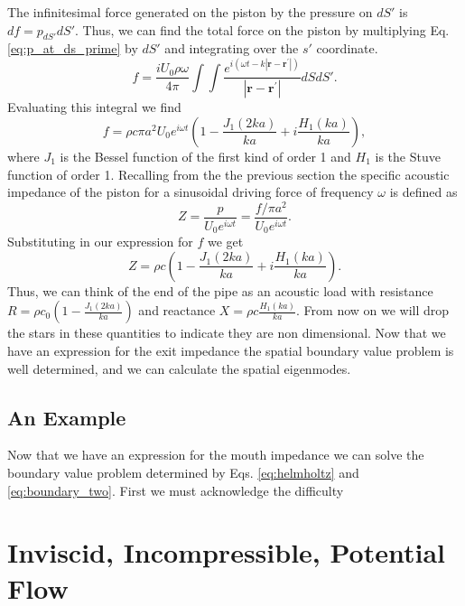 \documentclass[12pt, letter]{report}
\begin{document}
The infinitesimal force generated on the piston by the pressure on $dS'$ is $df = p_{dS'} dS'$. Thus, we can find the total force on the piston by multiplying Eq. \ref{eq:p_at_ds_prime} by $dS'$ and integrating over the $s'$ coordinate.
\begin{equation}
f = \frac{i U_0 \rho \omega}{4 \pi} \int \int \frac{e^{i(\omega t-k|\textbf{r}-\textbf{r}^\prime|)}}{|\textbf{r}-\textbf{r}^\prime|} dS dS'.
\end{equation}
Evaluating this integral we find
\begin{equation}
f=\rho c \pi a^2 U_0 e^{i \omega t} \left(1 - \frac{J_1(2ka)}{ka} + i \frac{H_1(ka)}{ka} \right),
\end{equation}
where $J_1$ is the Bessel function of the first kind of order 1 and $H_1$ is the Stuve function of order 1. Recalling from the the previous section the specific acoustic impedance of the piston for a sinusoidal driving force of frequency $\omega$ is defined as 
\begin{equation}
Z = \frac{p}{U_0 e^{i \omega t}} = \frac{f/ \pi a^2 }{U_0 e^{i \omega t}}.
\end{equation}
Substituting in our expression for $f$ we get
\begin{equation}
\label{eq:mouth_impedance}
Z = \rho c \left(1 - \frac{J_1(2ka)}{ka} + i \frac{H_1(ka)}{ka} \right).
\end{equation}
Thus, we can think of the end of the pipe as an acoustic load with resistance $R = \rho c_0 \left(1 - \frac{J_1(2 k a)}{k a} \right)$ and reactance $X = \rho c \frac{H_1(k a)}{k a}$. From now on we will drop the stars in these quantities to indicate they are non dimensional. Now that we have an expression for the exit impedance the spatial boundary value problem is well determined, and we can calculate the spatial eigenmodes.

\subsection{An Example}
Now that we have an expression for the mouth impedance we can solve the boundary value problem determined by Eqs. \ref{eq:helmholtz} and \ref{eq:boundary_two}. First we must acknowledge the difficulty 
\section{Inviscid, Incompressible, Potential Flow}
\end{document}
